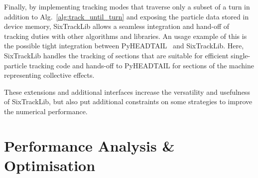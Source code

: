 \documentclass[a4paper,
               refpage,       %
               keeplastbox,   %
               ]{jacow}
\begin{document}
Finally, by implementing tracking modes that traverse only a subset of a turn in addition to Alg.~\ref{alg:track_until_turn} and exposing the particle data stored in device memory, SixTrackLib allows a seamless integration and hand-off of tracking duties with other algorithms and libraries. 
An usage example of this is the possible tight integration between PyHEADTAIL~\cite{pyheadtail-repo-2021} and SixTrackLib. Here, SixTrackLib handles the tracking of sections that are suitable for efficient single-particle tracking code and hands-off to PyHEADTAIL for sections of the machine representing collective effects.

These extensions and additional interfaces increase the versatility and usefulness of SixTrackLib, but also put additional constraints on some strategies to improve the numerical performance.  


\section{Performance Analysis \& Optimisation}
\end{document}
